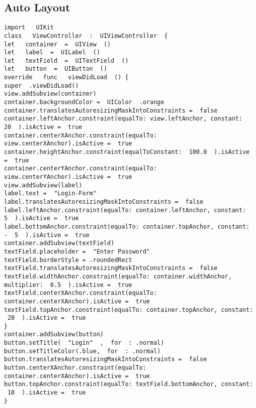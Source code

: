 \subsection{Auto Layout}
\begin{lstlisting}
import ​ ​ UIKit
class ​ ​ ViewController ​ : ​ UIViewController ​ {
let ​ ​ container ​ = ​ UIView ​ ()
let ​ ​ label ​ = ​ UILabel ​ ()
let ​ ​ textField ​ = ​ UITextField ​ ()
let ​ ​ button ​ = ​ UIButton ​ ()
override ​ ​ func ​ ​ viewDidLoad ​ () {
super ​ .viewDidLoad()
view.addSubview(container)
container.backgroundColor = ​ UIColor ​ .orange
container.translatesAutoresizingMaskIntoConstraints = ​ false
container.leftAnchor.constraint(equalTo: view.leftAnchor, constant: ​ 20 ​ ).isActive = ​ true
container.centerXAnchor.constraint(equalTo: view.centerXAnchor).isActive = ​ true
container.heightAnchor.constraint(equalToConstant: ​ 100.0 ​ ).isActive = ​ true
container.centerYAnchor.constraint(equalTo: view.centerYAnchor).isActive = ​ true
view.addSubview(label)
label.text = ​ "Login-Form"
label.translatesAutoresizingMaskIntoConstraints = ​ false
label.leftAnchor.constraint(equalTo: container.leftAnchor, constant: ​ 5 ​ ).isActive = ​ true
label.bottomAnchor.constraint(equalTo: container.topAnchor, constant: ​ - ​ 5 ​ ).isActive = ​ true
container.addSubview(textField)
textField.placeholder = ​ "Enter Password"
textField.borderStyle = .roundedRect
textField.translatesAutoresizingMaskIntoConstraints = ​ false
textField.widthAnchor.constraint(equalTo: container.widthAnchor, multiplier: ​ 0.5 ​ ).isActive = ​ true
textField.centerXAnchor.constraint(equalTo: container.centerXAnchor).isActive = ​ true
textField.topAnchor.constraint(equalTo: container.topAnchor, constant: ​ 20 ​ ).isActive = ​ true
}
container.addSubview(button)
button.setTitle( ​ "Login" ​ , ​ for ​ : .normal)
button.setTitleColor(.blue, ​ for ​ : .normal)
button.translatesAutoresizingMaskIntoConstraints = ​ false
button.centerXAnchor.constraint(equalTo: container.centerXAnchor).isActive = ​ true
button.topAnchor.constraint(equalTo: textField.bottomAnchor, constant: ​ 10 ​ ).isActive = ​ true
}
\end{lstlisting}
